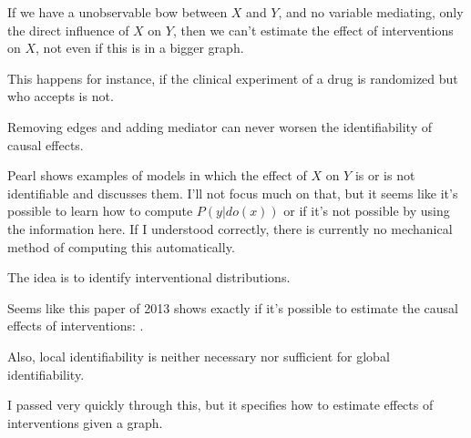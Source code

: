 If we have a unobservable bow between $X$ and $Y$, and no variable mediating, only the direct influence of $X$ on $Y$, then we can't estimate the effect of interventions on $X$, not even if this is in a bigger graph. 

This happens for instance, if the clinical experiment of a drug is randomized but who accepts is not.

Removing edges and adding mediator can never worsen the identifiability of causal effects. 

Pearl shows examples of models in which the effect of $X$ on $Y$ is or is not identifiable and discusses them. I'll not focus much on that, but it seems like it's possible to learn how to compute $P(y|do(x))$ or if it's not possible by using the information here. If I understood correctly, there is currently no mechanical method of computing this automatically.

The idea is to identify interventional distributions.

Seems like this paper of 2013 shows exactly if it's possible to estimate the causal effects of interventions: .

Also, local identifiability is neither necessary nor sufficient for global identifiability.

I passed very quickly through this, but it specifies how to estimate effects of interventions given a graph.
